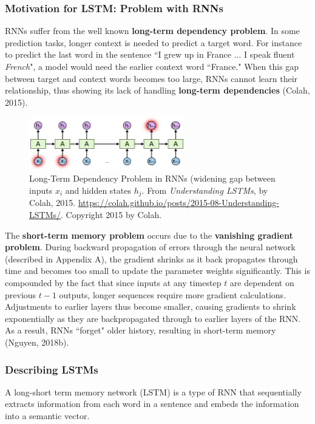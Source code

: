 \subsubsection{Motivation for LSTM: Problem with RNNs}

RNNs suffer from the well known \textbf{long-term dependency problem}. In some prediction tasks, longer context is needed to predict a target word. For instance to predict the last word in the sentence ``I grew up in France ... I speak fluent \emph{French}", a model would need the earlier context word ``France." When this gap between target and context words becomes too large, RNNs cannot learn their relationship, thus showing its lack of handling \textbf{long-term dependencies} (Colah, 2015). 

\begin{figure}[h]
\vspace{-5pt}
\centering
\includegraphics[width=0.6\textwidth]{imgs/rnn_longterm.png}
\vspace{-5pt}
\caption{\footnotesize Long-Term Dependency Problem in RNNs (widening gap between inputs $x_i$ and hidden states $h_j$. From \emph{Understanding LSTMs}, by Colah, 2015. \url{https://colah.github.io/posts/2015-08-Understanding-LSTMs/}. Copyright 2015 by Colah.}
\vspace{-5pt}
\end{figure}

The \textbf{short-term memory problem} occurs due to the \textbf{vanishing gradient problem}. During backward propagation of errors through the neural network (described in Appendix A), the gradient shrinks as it back propagates through time and becomes too small to update the parameter weights significantly. This is compounded by the fact that since inputs at any timestep $t$ are dependent on previous $t-1$ outputs, longer sequences require more gradient calculations. Adjustments to earlier layers thus become smaller, causing gradients to shrink exponentially as they are backpropagated through to earlier layers of the RNN. As a result, RNNs ``forget" older history, resulting in short-term memory (Nguyen, 2018b). 


\subsubsection{Describing LSTMs}
A long-short term memory network (LSTM) is a type of RNN that sequentially extracts information from each word in a sentence and embeds the information into a semantic vector. 

